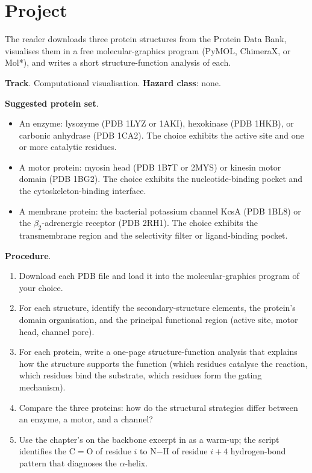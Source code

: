 \section{Project}

\begin{project}
The reader downloads three protein structures from the Protein Data
Bank, visualises them in a free molecular-graphics program (PyMOL,
ChimeraX, or Mol*), and writes a short structure-function analysis
of each.

\textbf{Track}. Computational visualisation.
\textbf{Hazard class}: none.

\textbf{Suggested protein set}.

\begin{itemize}[leftmargin=*]
\item An enzyme: lysozyme (PDB 1LYZ or 1AKI), hexokinase (PDB 1HKB),
  or carbonic anhydrase (PDB 1CA2). The choice exhibits the active
  site and one or more catalytic residues.
\item A motor protein: myosin head (PDB 1B7T or 2MYS) or kinesin
  motor domain (PDB 1BG2). The choice exhibits the nucleotide-binding
  pocket and the cytoskeleton-binding interface.
\item A membrane protein: the bacterial potassium channel KcsA (PDB
  1BL8) or the $\beta_2$-adrenergic receptor (PDB 2RH1). The choice
  exhibits the transmembrane region and the selectivity filter or
  ligand-binding pocket.
\end{itemize}

\textbf{Procedure}.

\begin{enumerate}[leftmargin=*]
\item Download each PDB file and load it into the molecular-graphics
  program of your choice.
\item For each structure, identify the secondary-structure elements,
  the protein's domain organisation, and the principal functional
  region (active site, motor head, channel pore).
\item For each protein, write a one-page structure-function analysis
  that explains how the structure supports the function (which
  residues catalyse the reaction, which residues bind the substrate,
  which residues form the gating mechanism).
\item Compare the three proteins: how do the structural strategies
  differ between an enzyme, a motor, and a channel?
\item Use the chapter's  on the
  backbone excerpt in  as a warm-up;
  the script identifies the C$=$O of residue $i$ to N$-$H of residue
  $i+4$ hydrogen-bond pattern that diagnoses the $\alpha$-helix.
\end{enumerate}


\end{project}
